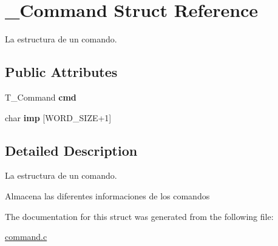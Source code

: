 \hypertarget{struct__Command}{}\section{\+\_\+\+Command Struct Reference}
\label{struct__Command}


La estructura de un comando.  


\subsection*{Public Attributes}
\begin{DoxyCompactItemize}
\item 
\mbox{\label{struct__Command_a61f89a0ef775ee09992b647cb25029c4}} 
T\+\_\+\+Command {\bfseries cmd}
\item 
\mbox{\label{struct__Command_a8488bf63ef9a5140ee6ef6edd2fac43a}} 
char {\bfseries imp} \mbox{[}W\+O\+R\+D\+\_\+\+S\+I\+ZE+1\mbox{]}
\end{DoxyCompactItemize}


\subsection{Detailed Description}
La estructura de un comando. 

Almacena las diferentes informaciones de los comandos 

The documentation for this struct was generated from the following file\+:\begin{DoxyCompactItemize}
\item 
\hyperlink{command_8c}{command.\+c}\end{DoxyCompactItemize}
